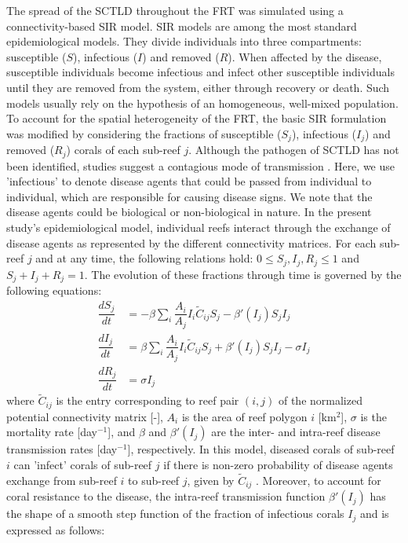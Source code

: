 The spread of the SCTLD throughout the FRT was simulated using a connectivity-based \cite{kermack1927contribution} SIR model. SIR models are among the most standard epidemiological models. They divide individuals into three compartments: susceptible ($S$), infectious ($I$) and removed ($R$). When affected by the disease, susceptible individuals become infectious and infect other susceptible individuals until they are removed from the system, either through recovery or death. Such models usually rely on the hypothesis of an homogeneous, well-mixed population. To account for the spatial heterogeneity of the FRT, the basic SIR formulation was modified by considering the fractions of susceptible ($S_j$), infectious ($I_j$) and removed ($R_j$) corals of each sub-reef $j$. Although the pathogen of SCTLD has not been identified, studies suggest a contagious mode of transmission \citep{aeby2019pathogenesis,muller2020spatial}. Here, we use 'infectious' to denote disease agents that could be passed from individual to individual, which are responsible for causing disease signs. We note that the disease agents could be biological or non-biological in nature. In the present study's epidemiological model, individual reefs interact through the exchange of disease agents as represented by the different connectivity matrices. For each sub-reef $j$ and at any time, the following relations hold: $0\leq S_j,I_j,R_j\leq 1$ and $S_j+I_j+R_j=1$. The evolution of these fractions through time is governed by the following equations:
\begin{equation}
    \begin{aligned}
        \dfrac{dS_j}{dt} &= -\beta\sum_i\dfrac{A_i}{A_j}I_i\tilde{C}_{ij}S_j - \beta'(I_j)S_jI_j \\
        \dfrac{dI_j}{dt} &= \beta\sum_i\dfrac{A_i}{A_j}I_i\tilde{C}_{ij}S_j + \beta'(I_j)S_jI_j - \sigma I_j \\
        \dfrac{dR_j}{dt} &= \sigma I_j
    \end{aligned}\label{eq:epidemio}
\end{equation}
where $\tilde{C}_{ij}$ is the entry corresponding to reef pair $(i,j)$ of the normalized potential connectivity matrix [-], $A_i$ is the area of reef polygon $i$ [km$^2$], $\sigma$ is the mortality rate [day$^{-1}$], and $\beta$ and $\beta'(I_j)$ are the inter- and intra-reef disease transmission rates [day$^{-1}$], respectively. In this model, diseased corals of sub-reef $i$ can 'infect' corals of sub-reef $j$ if there is non-zero probability of disease agents exchange from sub-reef $i$ to sub-reef $j$, given by $\tilde{C}_{ij}$ . Moreover, to account for coral resistance to the disease, the intra-reef transmission function $\beta'(I_j)$ has the shape of a smooth step function of the fraction of infectious corals $I_j$ and is expressed as follows:
